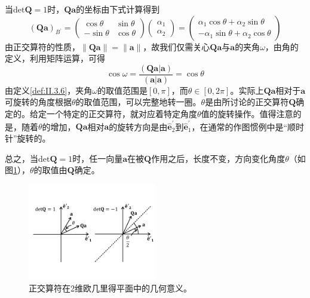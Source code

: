 \documentclass[../main.tex]{subfiles}
\begin{document}
当$\mathrm{det}\mathbf{Q}=1$时，$\mathbf{Qa}$的坐标由下式计算得到
\[\left(\mathbf{Qa}\right)_{B^\prime}=\left(\begin{array}{cc}\cos\theta&\sin\theta\\-\sin\theta&\cos\theta\end{array}\right)\left(\begin{array}{c}\alpha_1\\\alpha_2\end{array}\right)=\left(\begin{array}{c}\alpha_1\cos\theta+\alpha_2\sin\theta\\-\alpha_1\sin\theta+\alpha_2\cos\theta\end{array}\right)\]
由正交算符的性质，$\left\|\mathbf{Qa}\right\|=\left\|\mathbf{a}\right\|$，故我们仅需关心$\mathbf{Qa}$与$\mathbf{a}$的夹角$\omega$，由角的定义，利用矩阵运算，可得
\[
    \cos\omega=\frac{\left(\mathbf{Qa}|\mathbf{a}\right)}{\left(\mathbf{a}|\mathbf{a}\right)}=\cos\theta
\]
由定义\ref{def:II.3.6}，夹角$\omega$的取值范围是$\left[0,\pi\right]$，而$\theta\in\left[0,2\pi\right]$。实际上$\mathbf{Qa}$相对于$\mathbf{a}$可旋转的角度根据$\theta$的取值范围，可以完整地转一圈。$\theta$是由所讨论的正交算符$\mathbf{Q}$确定的。给定一个特定的正交算符，就对应着特定角度$\theta$值的旋转操作。值得注意的是，随着$\theta$的增加，$\mathbf{Qa}$相对$\mathbf{a}$的旋转方向是由$\mathbf{\hat{e}}^\prime_2$到$\mathbf{\hat{e}}^\prime_1$，在通常的作图惯例中是“顺时针”旋转的。

总之，当$\mathrm{det}\mathbf{Q}=1$时，任一向量$\mathbf{a}$在被$\mathbf{Q}$作用之后，长度不变，方向变化角度$\theta$（如图\ref{fig:II.3.1}），$\theta$的取值由$\mathbf{Q}$确定。

\begin{figure}[ht]
    \centering
    \includegraphics[width=0.5\textwidth]{images/II.3.1.pdf}
    \caption{正交算符在2维欧几里得平面中的几何意义。}
    \label{fig:II.3.1}
\end{figure}
\end{document}
